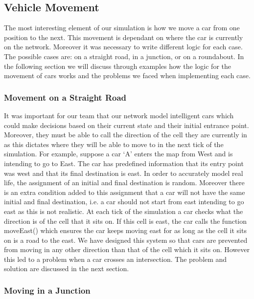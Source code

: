 \documentclass{article}
\begin{document}
\vspace{0.5cm}
 



\subsection{Vehicle Movement}\label{vehicleMovement}

The most interesting element of our simulation is how we move a car from one position to the next. This movement is dependant on where the car is currently on the network. Moreover it was necessary to write different logic for each case. The possible cases are: on a straight road, in a junction, or on a roundabout. In the following section we will discuss through examples how the logic for the movement of cars works and the problems we faced when implementing each case. 

\subsubsection{Movement on a Straight Road}
It was important for our team that our network model intelligent cars which could make decisions based on their current state and their initial entrance point. Moreover, they must be able to call the direction of the cell they are currently in as this dictates where they will be able to move to in the next tick of the simulation. For example, suppose a car `A' enters the map from West and is intending to go to East. The car has predefined information that its entry point was west and that its final destination is east. In order to accurately model real life, the assignment of an initial and final destination is random. 
Moreover there is an extra condition added to this assignment that a car will not have the same initial and final destination, i.e. a car should not start from east intending to go east as this is not realistic. At each tick of the simulation a car checks what the  direction is of the cell that it sits on. If this cell is east, the car calls the function moveEast() which ensures the car keeps moving east for as long as the cell it sits on is a road to the east. We have designed this system so that cars are prevented from moving in any other direction than that of the cell which it sits on. However this led to a problem when a car crosses an intersection. The problem and solution are discussed in the next section. 

\subsubsection{Moving in a Junction} \label{movementOnAJunction}
\end{document}
